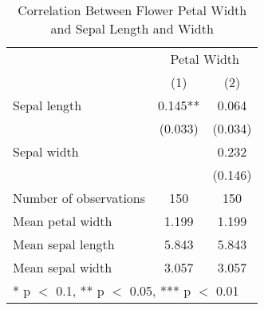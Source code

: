 \begin{table}[H]
\caption{Correlation Between Flower Petal Width and Sepal Length and Width} 
\label{tab:flower_table}
\centering
\begin{tabular}[t]{lcc}
\toprule
& \multicolumn{2}{c}{Petal Width} \\
  & (1) & (2)\\
\midrule
Sepal length & 0.145** & 0.064\\
 & (0.033) & (0.034)\\
Sepal width &  & 0.232\\
 &  & (0.146)\\
\midrule
Number of observations & 150 & 150\\
Mean petal width & 1.199 & 1.199\\
Mean sepal length & 5.843 & 5.843\\
Mean sepal width & 3.057 & 3.057\\
\bottomrule
\multicolumn{3}{l}{\rule{0pt}{1em}* p $<$ 0.1, ** p $<$ 0.05, *** p $<$ 0.01}\\
\end{tabular}
\end{table}
